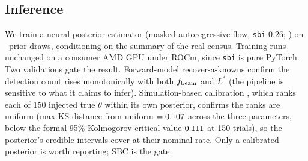 \documentclass[twocolumn]{aastex631}
\newcommand{\code}[1]{\texttt{#1}}
\begin{document}
\subsection{Inference}
We train a neural posterior estimator (masked autoregressive flow,
\code{sbi} 0.26; \citealt{sbi_toolkit}) on \svbRealNSims\ prior draws, conditioning on the summary
of the real census. Training runs unchanged on a consumer AMD GPU under ROCm, since \code{sbi} is
pure PyTorch. Two validations gate the result. Forward-model recover-a-knowns confirm the
detection count rises monotonically with both $f_{\rm beam}$ and $L^*$ (the pipeline is
sensitive to what it claims to infer). Simulation-based calibration
\citep[SBC;][]{talts2018}, which ranks each of 150 injected true $\theta$ within its own
posterior, confirms the ranks are uniform (max KS distance from uniform $= 0.107$
across the three parameters, below the formal 95\% Kolmogorov critical value $0.111$ at
150 trials), so the posterior's credible intervals cover at their nominal rate. Only a calibrated
posterior is worth reporting; SBC is the gate.
\end{document}
